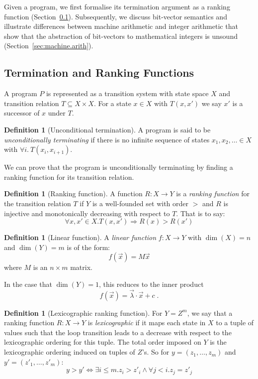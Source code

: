 \documentclass[preprint]{sigplanconf}
\theoremstyle{definition}
\newtheorem{definition}[theorem]{Definition}
\begin{document}
Given a program, we first formalise its termination argument as a ranking
function (Section~\ref{sec:ranking.functions}).  Subsequently, we discuss
bit-vector semantics and illustrate differences between machine arithmetic
and integer arithmetic that show that the abstraction of bit-vectors to
mathematical integers is unsound (Section~\ref{sec:machine.arith}).

\subsection{Termination and Ranking Functions} \label{sec:ranking.functions}

A program $P$ is represented as a transition system with state space $X$ and
transition relation $T \subseteq X \times X$.  For a state
$x \in X$ with $T(x,x')$ we say $x'$ is a successor of $x$ under $T$.

\begin{definition}[Unconditional termination]
%
A program is said to be \emph{unconditionally terminating} if
there is no infinite sequence of states $x_1, x_2, \ldots \in X$ with
$\forall i.~T(x_i, x_{i+1})$.
%
\end{definition}

We can prove that the program is unconditionally terminating by
finding a ranking function for its transition relation.
%
\begin{definition}[Ranking function]
%
A function ${R:X\to Y}$ is a \emph{ranking function} for the
transition relation $T$ if $Y$ is a well-founded set with order $>$ and 
$R$ is injective and monotonically decreasing with respect to $T$.  That is
to say:
$$\forall x, x' \in X. T(x, x') \Rightarrow R(x) > R(x')$$
%
\end{definition}

\begin{definition}[Linear function]
A \emph{linear function} $f: X \to Y$ 
with $\dim(X) = n$ and $\dim(Y) = m$ is of the form: $$f(\vec{x}) = M\vec{x}$$ where
$M$ is an $n \times m$ matrix.
\end{definition}

In the case that $\dim(Y) = 1$, this reduces to the inner product
%
$$f(\vec{x}) = \vec{\lambda} \cdotp \vec{x} + c \;.$$

\begin{definition}[Lexicographic ranking function]
For $Y = Z^m$, we say that a ranking function $R: X \to Y$ is \emph{lexicographic}
if it maps each state in $X$ to a tuple of values such that the loop transition leads to a decrease with
respect to the lexicographic ordering for this tuple.
The total order imposed on $Y$ is the lexicographic ordering
induced on tuples of $Z$'s.  So for $y = (z_1, \ldots, z_m)$ and
$y' = (z'_1, \ldots, z'_m)$:
\[
 y > y' \iff \exists i \leq m . z_i > z'_i \wedge \forall j < i . z_j = z'_j
\]


\end{definition}
\end{document}
